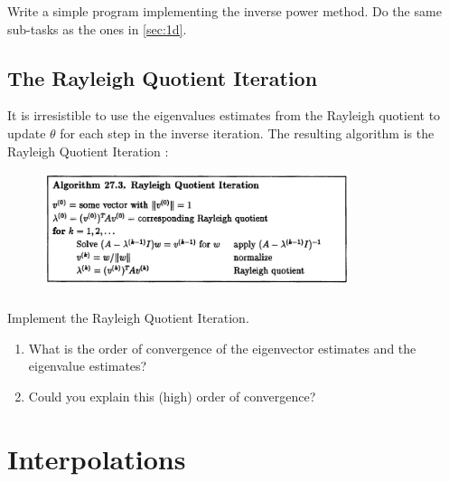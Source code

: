 \documentclass[11pt,letterpaper]{report}
\begin{document}
\subsection{}
Write a simple program implementing the inverse power method. Do the same sub-tasks as the ones in \ref{sec:1d}.

\section{The Rayleigh Quotient Iteration}
It is irresistible to use the eigenvalues estimates from the Rayleigh quotient to update $\theta$ for each step in the inverse iteration. The resulting algorithm is the Rayleigh Quotient Iteration \cite{TrefethenBau_97}:
\begin{figure}[H]
    \centering
    \includegraphics[width = 0.8\textwidth]{Session_9/latex/figs/TB_Rayleigh_Quo_Iter}
\end{figure}

\subsection{}
Implement the Rayleigh Quotient Iteration. 
\begin{enumerate}
    \item What is the order of convergence of the eigenvector estimates and the eigenvalue estimates?
    \item Could you explain this (high) order of convergence?
\end{enumerate}
\chapter{Interpolations}



\newpage


\end{document}
